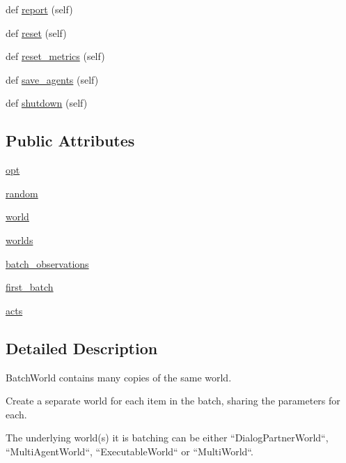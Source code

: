 \begin{DoxyCompactItemize}
\item 
def \hyperlink{classparlai_1_1core_1_1worlds_1_1BatchWorld_af6ca90db5542bf4a74a122ea04ba8bef}{report} (self)
\item 
def \hyperlink{classparlai_1_1core_1_1worlds_1_1BatchWorld_a00ba541479129163a13a0377797504e1}{reset} (self)
\item 
def \hyperlink{classparlai_1_1core_1_1worlds_1_1BatchWorld_a16a31209d87f0f9bf27871110bd63aa6}{reset\+\_\+metrics} (self)
\item 
def \hyperlink{classparlai_1_1core_1_1worlds_1_1BatchWorld_a84ee0ac53e07cbfc9bdb8a978a8df7e1}{save\+\_\+agents} (self)
\item 
def \hyperlink{classparlai_1_1core_1_1worlds_1_1BatchWorld_ad351080076e31498e14789beddf6fea6}{shutdown} (self)
\end{DoxyCompactItemize}
\subsection*{Public Attributes}
\begin{DoxyCompactItemize}
\item 
\hyperlink{classparlai_1_1core_1_1worlds_1_1BatchWorld_a75c0ed09cce56774c61c9f59b543ed88}{opt}
\item 
\hyperlink{classparlai_1_1core_1_1worlds_1_1BatchWorld_a27b70249faa0bbe4bdff806a3f31ec13}{random}
\item 
\hyperlink{classparlai_1_1core_1_1worlds_1_1BatchWorld_ad7d651ac0fb1ee9b52ba7f134602e98e}{world}
\item 
\hyperlink{classparlai_1_1core_1_1worlds_1_1BatchWorld_ae1b967d3229b90064ff50c1a55dc2b96}{worlds}
\item 
\hyperlink{classparlai_1_1core_1_1worlds_1_1BatchWorld_a6f13286dedb14f257e043339b543cdeb}{batch\+\_\+observations}
\item 
\hyperlink{classparlai_1_1core_1_1worlds_1_1BatchWorld_a7cae7f1a21fbe52133bf9e75a4a3b673}{first\+\_\+batch}
\item 
\hyperlink{classparlai_1_1core_1_1worlds_1_1BatchWorld_a89bd00f625520bf66dda7d113cf0b40e}{acts}
\end{DoxyCompactItemize}


\subsection{Detailed Description}
\begin{DoxyVerb}BatchWorld contains many copies of the same world.

Create a separate world for each item in the batch, sharing
the parameters for each.

The underlying world(s) it is batching can be either
``DialogPartnerWorld``, ``MultiAgentWorld``, ``ExecutableWorld`` or
``MultiWorld``.
\end{DoxyVerb}
 

